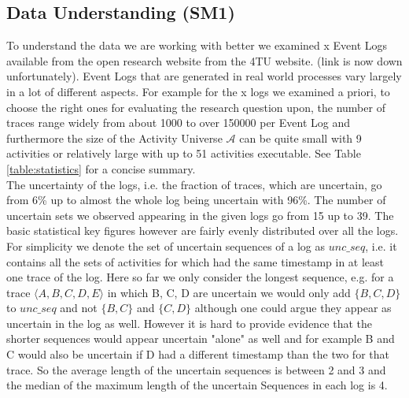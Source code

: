 \documentclass[
	a4paper,
	pagesize,
	pdftex,
	12pt,
	ngerman,
	fleqn,
	final,
	]{scrartcl}
\theoremstyle{plain}
\theoremstyle{definition}
\begin{document}
	\subsection{Data Understanding (SM1)}
	To understand the data we are working with better we examined x Event Logs available from the open research website from the 4TU website. (link is now down unfortunately). Event Logs that are generated in real world processes vary largely in a lot of different aspects. For example for the x logs we examined a priori, to choose the right ones for evaluating the research question upon, the number of traces range widely from about 1000 to over 150000 per Event Log and furthermore the size of the Activity Universe \(\mathcal{A}\) can be quite small with 9 activities or relatively large with up to 51 activities executable. See Table \ref{table:statistics} for a concise summary. \\ 
	The uncertainty of the logs, i.e. the fraction of traces, which are uncertain, go from 6\% up to almost the whole log being uncertain with 96\%. The number of uncertain sets we observed appearing in the given logs go from 15 up to 39.
	The basic statistical key figures however are fairly evenly distributed over all the logs. For simplicity we denote the set of uncertain sequences of a log as $unc\_seq$, i.e. it contains all the sets of activities for which had the same timestamp in at least one trace of the log. Here so far we only consider the longest sequence, e.g. for a trace $\langle A,B,C,D,E \rangle$ in which B, C, D are uncertain we would only add $\{B, C, D\}$ to $unc\_seq$ and not $\{B, C\}$ and $\{C, D\}$ although one could argue they appear as uncertain in the log as well. However it is hard to provide evidence that the shorter sequences would appear uncertain "alone" as well and for example B and C would also be uncertain if D had a different timestamp than the two for that trace.  So the average length of the uncertain sequences is between 2 and 3 and the median of the maximum length of the uncertain Sequences in each log is 4. \\  
	
\end{document}
